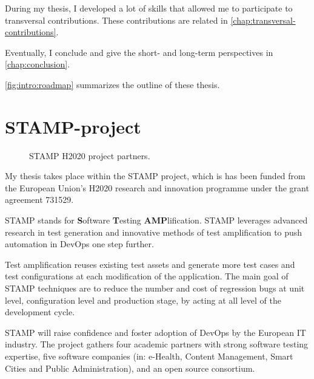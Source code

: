 During my thesis, I developed a lot of skills that allowed me to participate to transversal contributions. 
These contributions are related in \autoref{chap:transversal-contributions}.

Eventually, I conclude and give the short- and long-term perspectives in \autoref{chap:conclusion}.

\autoref{fig:intro:roadmap} summarizes the outline of these thesis.

\section{STAMP-project}
\label{sec:intro:stamp}

\begin{figure}[h]
	\centering
	\caption{STAMP H2020 project partners.}
	\label{fig:intro:partners-map}
\end{figure}

My thesis takes place within the STAMP project, which is has been funded from the European Union's H2020 research and innovation programme under the grant agreement 731529.

STAMP stands for \textbf{S}oftware \textbf{T}esting \textbf{AMP}lification.
STAMP leverages advanced research in test generation and innovative methods of test amplification to push automation in DevOps one step further.

Test amplification reuses existing test assets and generate more test cases and test configurations at each modification of the application.
The main goal of STAMP techniques are to reduce the number and cost of regression bugs at unit level, configuration level and production stage, by acting at all level of the development cycle.

STAMP will raise confidence and foster adoption of DevOps by the European IT industry.
The project gathers four academic partners with strong software testing expertise, five software companies (in: e-Health, Content Management, Smart Cities and Public Administration), and an open source consortium. 

